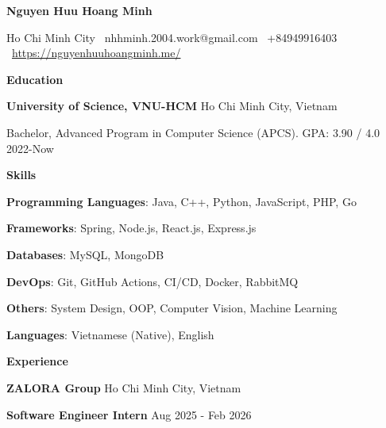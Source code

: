 \documentclass[10pt]{article}
\begin{document}
\begin{center}
    \textbf{Nguyen Huu Hoang Minh}\\ 
    \hrulefill
\end{center}

\begin{center}
    Ho Chi Minh City \textbullet \ nhhminh.2004.work@gmail.com \textbullet \ +84949916403 \textbullet \ \url{https://nguyenhuuhoangminh.me/}
\end{center}

\begin{center}
    \textbf{Education}
\end{center}
\textbf{University of Science, VNU-HCM} \hfill Ho Chi Minh City, Vietnam

Bachelor, Advanced Program in Computer Science (APCS). GPA: 3.90 / 4.0 \hfill 2022-Now

\begin{center}
    \textbf{Skills}
\end{center}

\textbf{Programming Languages}: Java, C++, Python, JavaScript, PHP, Go

\textbf{Frameworks}: Spring, Node.js, React.js, Express.js

\textbf{Databases}: MySQL, MongoDB

\textbf{DevOps}: Git, GitHub Actions, CI/CD, Docker, RabbitMQ

\textbf{Others}: System Design, OOP, Computer Vision, Machine Learning

\textbf{Languages}: Vietnamese (Native), English

\begin{center}
    \textbf{Experience}
\end{center}

\textbf{ZALORA Group} \hfill Ho Chi Minh City, Vietnam

\textbf{Software Engineer Intern} \hfill Aug 2025 - Feb 2026
\end{document}
